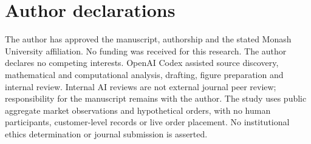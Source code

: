 \documentclass[11pt]{article}
\begin{document}
\section*{Author declarations}
The author has approved the manuscript, authorship and the stated Monash University affiliation. No funding was received for this research. The author declares no competing interests. OpenAI Codex assisted source discovery, mathematical and computational analysis, drafting, figure preparation and internal review. Internal AI reviews are not external journal peer review; responsibility for the manuscript remains with the author. The study uses public aggregate market observations and hypothetical orders, with no human participants, customer-level records or live order placement. No institutional ethics determination or journal submission is asserted.

\begingroup\raggedright


\endgroup
\end{document}
